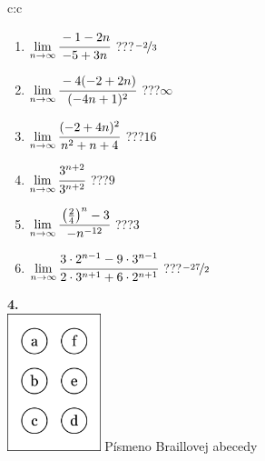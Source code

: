 \documentclass[10pt]{report}
\begin{document}
\begin{tabular}{c:c}
\begin{minipage}[c][104.5mm][t]{0.5\linewidth}
\begin{center}
\begin{minipage}{0.79\linewidth}
\begin{center}
\begin{varwidth}{\linewidth}
\begin{enumerate}
\normalsize
\item $\lim\limits_{n\to\infty}\cfrac{-1-2n}{-5+3n}$\quad \dotfill\; ???\;\dotfill \quad $\nicefrac{-2}{3}$
\item $\lim\limits_{n\to\infty}\cfrac{-4(-2+2n)}{(-4n+1)^2}$\quad \dotfill\; ???\;\dotfill \quad $\infty$
\item $\lim\limits_{n\to\infty}\cfrac{(-2+4n)^2}{n^2+n+4}$\quad \dotfill\; ???\;\dotfill \quad $16$
\item $\lim\limits_{n\to\infty}\cfrac{3^{n+2}}{3^{n+2}}$\quad \dotfill\; ???\;\dotfill \quad $9$
\item $\lim\limits_{n\to\infty}\cfrac{\left(\frac{2}{4}\right)^n -3}{-n^{-12}}$\quad \dotfill\; ???\;\dotfill \quad $3$
\item $\lim\limits_{n\to\infty}\cfrac{3\cdot 2^{n-1}-9\cdot 3^{n-1}}{2\cdot 3^{n+1}+6\cdot 2^{n+1}}$\quad \dotfill\; ???\;\dotfill \quad $\nicefrac{-27}{2}$
\end{enumerate}
\end{varwidth}
\end{center}
\end{minipage}
\begin{minipage}{0.20\linewidth}
\begin{center}
{\Huge\bfseries 4.} \\[2mm]
\includegraphics[height=40mm]{../images/braille.png}
{\small Písmeno Braillovej abecedy}
\end{center}
\end{minipage}
\end{center}
\end{minipage}
%
\end{tabular}
\newpage
\thispagestyle{empty}
\end{document}
